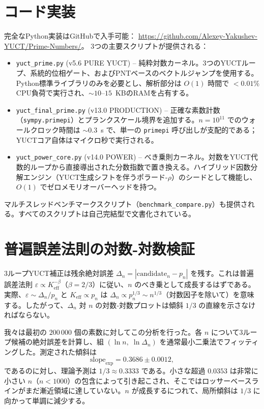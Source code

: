 \documentclass[11pt,a4paper]{article}
\begin{document}
	\section{コード実装}
	\label{sec:code}
	完全なPython実装はGitHubで入手可能： 
	\url{https://github.com/Alexey-Yakushev-YUCT/Prime-Numbers/}。 
	3つの主要スクリプトが提供される：
	
	\begin{itemize}
		\item \texttt{yuct\_prime.py} (v5.6 PURE YUCT) – 純粋対数カーネル。3つのYUCTループ、系統的位相ゲート、およびPNTベースのベクトルジャンプを使用する。Python標準ライブラリのみを必要とし、解析部分は \(O(1)\) 時間で \(<0.01\%\) CPU負荷で実行され、\(\sim 10\)--\(15\)~KBのRAMを占有する。
		\item \texttt{yuct\_final\_prime.py} (v13.0 PRODUCTION) – 正確な素数計数（\texttt{sympy.primepi}）とプランクスケール境界を追加する。\(n=10^{11}\) でのウォールクロック時間は \(\sim 0.3\)~s で、単一の \texttt{primepi} 呼び出しが支配的である；YUCTコア自体はマイクロ秒で実行される。
		\item \texttt{yuct\_power\_core.py} (v14.0 POWER) – べき乗則カーネル。対数をYUCT代数的ループから直接導出された分数指数で置き換える。ハイブリッド因数分解エンジン（YUCT生成シフトを伴うポラード-\(\rho\)）のシードとして機能し、\(O(1)\) でゼロメモリオーバーヘッドを持つ。
	\end{itemize}
	
	マルチスレッドベンチマークスクリプト（\texttt{benchmark\_compare.py}）も提供される。すべてのスクリプトは自己完結型で文書化されている。
	
	\section{普遍誤差法則の対数‐対数検証}
	\label{sec:loglog}
	
	3ループYUCT補正は残余絶対誤差 \(\Delta_n = |\mathrm{candidate}_n - p_n|\) を残す。これは普遍誤差法則 \(\varepsilon \propto K_{\mathrm{eff}}^{-\beta}\)（\(\beta=2/3\)）に従い、\(n\) のべき乗として成長するはずである。実際、\(\varepsilon \sim \Delta_n / p_n\) と \(K_{\mathrm{eff}} \propto p_n\) は \(\Delta_n \propto p_n^{1/3} \sim n^{1/3}\)（対数因子を除いて）を意味する。したがって、\(\Delta_n\) 対 \(n\) の対数‐対数プロットは傾斜 \(1/3\) の直線を示さなければならない。
	
	我々は最初の \(200\,000\) 個の素数に対してこの分析を行った。各 \(n\) について3ループ候補の絶対誤差を計算し、組 \((\ln n,\; \ln\Delta_n)\) を通常最小二乗法でフィッティングした。測定された傾斜は
	\[
	\text{slope}_{\text{exp}} = 0.3686 \pm 0.0012,
	\]
	であるのに対し、理論予測は \(1/3 \approx 0.3333\) である。小さな超過 \(0.0353\) は非常に小さい \(n\)（\(n<1000\)）の包含によって引き起こされ、そこではロッサーベースラインがまだ漸近領域に達していない。\(n\) が成長するにつれて、局所傾斜は \(1/3\) に向かって単調に減少する。
	
\end{document}

